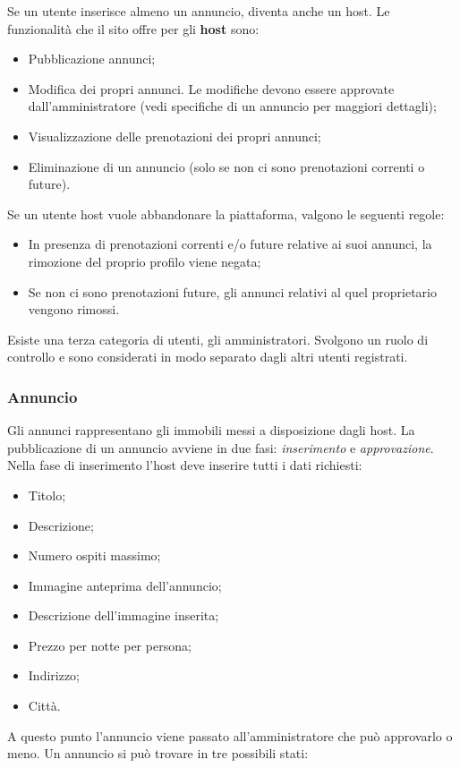 \documentclass[1_relazione.tex]{subfiles}
\begin{document}
Se un utente inserisce almeno un annuncio, diventa anche un host. Le funzionalit\`{a} che il sito offre per gli \textbf{host} sono:
\begin{itemize}
\item Pubblicazione annunci;
\item Modifica dei propri annunci. Le modifiche devono essere approvate dall'amministratore (vedi specifiche di un annuncio per maggiori dettagli);
\item Visualizzazione delle prenotazioni dei propri annunci;
\item Eliminazione di un annuncio (solo se non ci sono prenotazioni correnti o future).
\end{itemize}
Se un utente host vuole abbandonare la piattaforma, valgono le seguenti regole:
\begin{itemize}
\item In presenza di prenotazioni correnti e/o future relative ai suoi annunci, la rimozione del proprio profilo viene negata;
\item Se non ci sono prenotazioni future, gli annunci relativi al quel proprietario vengono rimossi.
\end{itemize}
Esiste una terza categoria di utenti, gli amministratori. Svolgono un ruolo di controllo e sono considerati in modo separato dagli altri utenti registrati.  \\
\subsubsection{Annuncio} 
Gli annunci rappresentano gli immobili messi a disposizione dagli host. La pubblicazione di un annuncio avviene in due fasi: \textit{inserimento} e \textit{approvazione}.
Nella fase di inserimento l'host deve inserire tutti i dati richiesti:
\begin{itemize}
 \item Titolo;
 \item Descrizione;
 \item Numero ospiti massimo;
 \item Immagine anteprima dell'annuncio;
 \item Descrizione dell'immagine inserita;
 \item Prezzo per notte per persona;
 \item Indirizzo;
 \item Città.
\end{itemize}
A questo punto l'annuncio viene passato all'amministratore che può approvarlo o meno. Un annuncio si può trovare in tre possibili stati:
\end{document}
